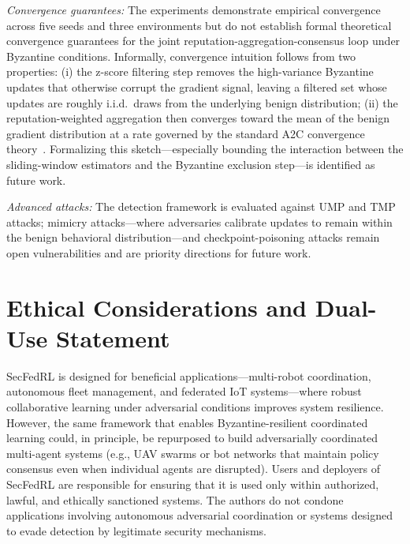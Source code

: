 \documentclass[12pt,a4paper]{article}
\begin{document}
\textit{Convergence guarantees:}
The experiments demonstrate empirical convergence across five seeds and three
environments but do not establish formal theoretical convergence guarantees for the
joint reputation-aggregation-consensus loop under Byzantine conditions. Informally,
convergence intuition follows from two properties: (i) the z-score filtering step
removes the high-variance Byzantine updates that otherwise corrupt the gradient signal,
leaving a filtered set whose updates are roughly i.i.d.\ draws from the underlying
benign distribution; (ii) the reputation-weighted aggregation then converges toward the
mean of the benign gradient distribution at a rate governed by the standard A2C
convergence theory~\cite{ref15}. Formalizing this sketch---especially bounding the
interaction between the sliding-window estimators and the Byzantine exclusion step---is
identified as future work.

\textit{Advanced attacks:} The detection framework is evaluated against UMP and TMP
attacks; mimicry attacks---where adversaries calibrate updates to remain within the
benign behavioral distribution---and checkpoint-poisoning attacks remain open
vulnerabilities and are priority directions for future work.

\section*{Ethical Considerations and Dual-Use Statement}

SecFedRL is designed for beneficial applications---multi-robot coordination, autonomous
fleet management, and federated IoT systems---where robust collaborative learning under
adversarial conditions improves system resilience. However, the same framework that
enables Byzantine-resilient coordinated learning could, in principle, be repurposed to
build adversarially coordinated multi-agent systems (e.g., UAV swarms or bot networks
that maintain policy consensus even when individual agents are disrupted). Users and
deployers of SecFedRL are responsible for ensuring that it is used only within
authorized, lawful, and ethically sanctioned systems. The authors do not condone
applications involving autonomous adversarial coordination or systems designed to
evade detection by legitimate security mechanisms.

\end{document}
